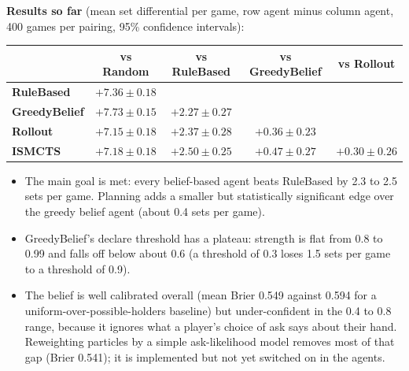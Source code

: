 \documentclass[10pt]{article}
\begin{document}
\textbf{Results so far} (mean set differential per game, row agent minus column agent, 400 games
per pairing, 95\% confidence intervals):

\begin{center}
\small
\begin{tabular}{@{}lcccc@{}}
\toprule
 & \textbf{vs Random} & \textbf{vs RuleBased} & \textbf{vs GreedyBelief} & \textbf{vs Rollout} \\
\midrule
\textbf{RuleBased}    & $+7.36 \pm 0.18$ &                  &                  &                  \\
\textbf{GreedyBelief} & $+7.73 \pm 0.15$ & $+2.27 \pm 0.27$ &                  &                  \\
\textbf{Rollout}      & $+7.15 \pm 0.18$ & $+2.37 \pm 0.28$ & $+0.36 \pm 0.23$ &                  \\
\textbf{ISMCTS}       & $+7.18 \pm 0.18$ & $+2.50 \pm 0.25$ & $+0.47 \pm 0.27$ & $+0.30 \pm 0.26$ \\
\bottomrule
\end{tabular}
\end{center}

\begin{itemize}
  \item The main goal is met: every belief-based agent beats RuleBased by 2.3 to 2.5 sets per game.
    Planning adds a smaller but statistically significant edge over the greedy belief agent
    (about 0.4 sets per game).
  \item GreedyBelief's declare threshold has a plateau: strength is flat from 0.8 to 0.99 and falls
    off below about 0.6 (a threshold of 0.3 loses 1.5 sets per game to a threshold of 0.9).
  \item The belief is well calibrated overall (mean Brier 0.549 against 0.594 for a
    uniform-over-possible-holders baseline) but under-confident in the 0.4 to 0.8 range, because it
    ignores what a player's choice of ask says about their hand. Reweighting particles by a simple
    ask-likelihood model removes most of that gap (Brier 0.541); it is implemented but not yet
    switched on in the agents.
\end{itemize}
\end{document}

